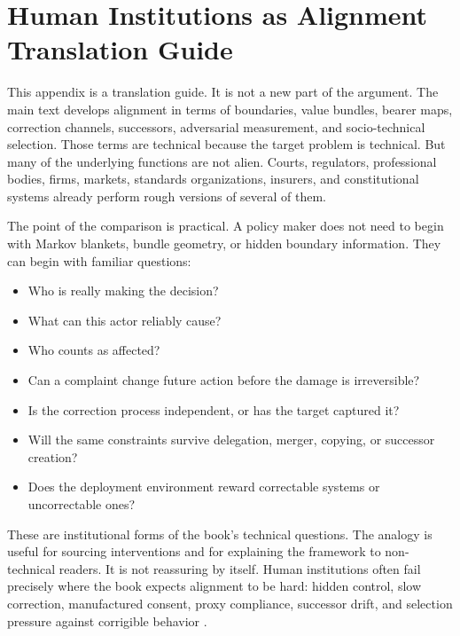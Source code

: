 \chapter{Human Institutions as Alignment Translation Guide}
\label{appj-institutional-translation}

\begin{refsection}

This appendix is a translation guide.
It is not a new part of the argument.
The main text develops alignment in terms of boundaries, value bundles, bearer maps, correction channels, successors, adversarial measurement, and socio-technical selection.
Those terms are technical because the target problem is technical.
But many of the underlying functions are not alien.
Courts, regulators, professional bodies, firms, markets, standards organizations, insurers, and constitutional systems already perform rough versions of several of them.

The point of the comparison is practical.
A policy maker does not need to begin with Markov blankets, bundle geometry, or hidden boundary information.
They can begin with familiar questions:

\begin{itemize}[nosep]
  \item Who is really making the decision?
  \item What can this actor reliably cause?
  \item Who counts as affected?
  \item Can a complaint change future action before the damage is irreversible?
  \item Is the correction process independent, or has the target captured it?
  \item Will the same constraints survive delegation, merger, copying, or successor creation?
  \item Does the deployment environment reward correctable systems or uncorrectable ones?
\end{itemize}

These are institutional forms of the book's technical questions.
The analogy is useful for sourcing interventions and for explaining the framework to non-technical readers.
It is not reassuring by itself.
Human institutions often fail precisely where the book expects alignment to be hard: hidden control, slow correction, manufactured consent, proxy compliance, successor drift, and selection pressure against corrigible behavior \autocite{yudkowsky2017inadequate}.


\end{refsection}
